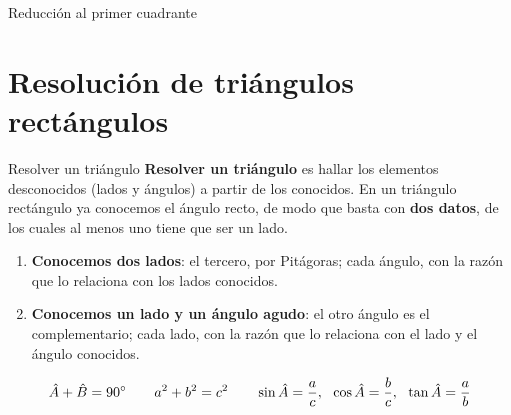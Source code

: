 \documentclass[11pt,a4paper]{article}
\makeatletter
\newcommand{\fmm}[1]{\setbox0=\hbox{$#1$}\ifdim\wd0>0.8\linewidth\def\fmmnext{\fmmdisp{#1}}\else\def\fmmnext{\mbox{\box0}}\fi\fmmnext}
\def\fmmdisp#1{\@ifnextchar.{\fmmdispp{#1}}{\@ifnextchar,{\fmmdispc{#1}}{\@ifnextchar;{\fmmdisps{#1}}{\fmdisp{#1}}}}}
\def\fmmdispp#1.{\fmdisp{#1\,.}}\def\fmmdispc#1,{\fmdisp{#1\,,}}\def\fmmdisps#1;{\fmdisp{#1\,;}}
\newcommand{\fmdisp}[1]{\[\setbox2=\hbox{$\displaystyle #1$}\ifdim\wd2>\linewidth\resizebox{\linewidth}{!}{\box2}\else\box2\fi\]}
\newcommand{\fmuline}[1]{\textbf{\color{fmaccent}#1}}
\makeatother
\begin{document}
\begin{fmprop}{Reducción al primer cuadrante}
\end{fmprop}


\Needspace{5.7cm}
\section{Resolución de triángulos rectángulos}\hypertarget{sec5}{}
\begin{fmdef}{Resolver un triángulo}
\textbf{Resolver un triángulo} es hallar los elementos desconocidos (lados y ángulos) a partir de los conocidos. En un triángulo rectángulo ya conocemos el ángulo recto, de modo que basta con \textbf{dos datos}, de los cuales al menos uno tiene que ser un lado.

\begin{enumerate}
\item \textbf{Conocemos dos lados}: el tercero, por Pitágoras; cada ángulo, con la razón que lo relaciona con los lados conocidos.
\item \textbf{Conocemos un lado y un ángulo agudo}: el otro ángulo es el complementario; cada lado, con la razón que lo relaciona con el lado y el ángulo conocidos.
\end{enumerate}

\fmdisp{\hat A+\hat B=90^\circ\qquad a^2+b^2=c^2\qquad \sin\hat A=\frac ac,\ \ \cos\hat A=\frac bc,\ \ \tan\hat A=\frac ab}

\end{fmdef}
\end{document}
